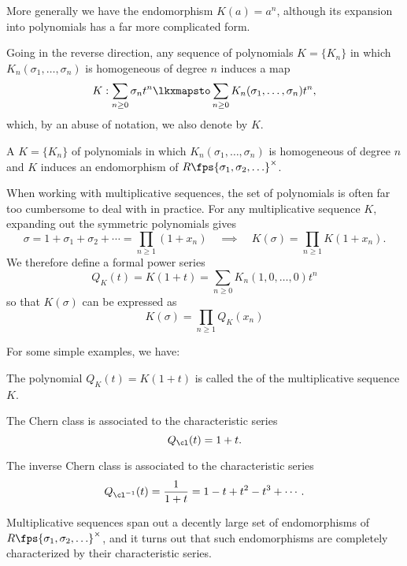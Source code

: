 \begin{example}
	More generally we have the endomorphism $K(a)=a^n$, although its expansion into polynomials has a far more complicated form.
\end{example}

Going in the reverse direction, any sequence of polynomials $K=\{K_n\}$ in which $K_n(\sigma_1,\ldots, \sigma_n)$ is homogeneous of degree $n$ induces a map
\begin{equation}\label{eq:multiplicative-sequence-endomorphism}
	K : \sum_{n\geq 0} \sigma_n t^n \lkxmapsto \sum_{n\geq 0} K_n(\sigma_1,\ldots, \sigma_n) t^n,
\end{equation}
which, by an abuse of notation, we also denote by $K$. 

\begin{definition}
	A  $K=\{K_n\}$ of polynomials in which $K_n(\sigma_1,\ldots, \sigma_n)$ is homogeneous of degree $n$ and $K$ induces an endomorphism of $R\fps{\sigma_1,\sigma_2,\ldots}^\times$.
\end{definition}


When working with multiplicative sequences, the set of polynomials is often far too cumbersome to deal with in practice. For any multiplicative sequence $K$,
expanding out the symmetric polynomials gives
\[
	\sigma = 1+\sigma_1+\sigma_2+\cdots = \prod_{n\geq 1}(1+x_n)
	\quad\implies\quad
	K(\sigma) = \prod_{n\geq 1} K(1+x_n).
\]
We therefore define a formal power series
\[
		Q_K(t) = K(1+t)=\sum_{n\geq 0}K_n(1,0,\ldots, 0) t^n
\]
so that $K(\sigma)$ can be expressed as
\[
		K(\sigma) = \prod_{n\geq 1}Q_K(x_n)
\]

For some simple examples, we have:

\begin{definition}
	The polynomial $Q_K(t)=K(1+t)$ is called the  of the multiplicative sequence $K$.
\end{definition}

\begin{example}
	The Chern class is associated to the characteristic series
	\[Q_\cl(t)=1+t.\]
\end{example}

\begin{example}
	The  inverse Chern class is associated to the characteristic series
	\[Q_{\cl^{-1}}(t)=\frac{1}{1+t}=1-t+t^2-t^3+\cdots.\]
\end{example}

Multiplicative sequences span out a decently large set of endomorphisms of $R\fps{\sigma_1,\sigma_2,\ldots}^\times$, and it turns out that such endomorphisms are completely characterized by their characteristic series.


